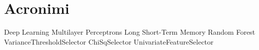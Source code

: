 \documentclass[main.tex]{subfiles}
\begin{document}
\chapter*{Acronimi}
\label{chap:Acronyms}
\begin{acronym}

     {Deep Learning}
     {Multilayer Perceptrons}
     {Long Short-Term Memory}
     {Random Forest}
     {VarianceThresholdSelector}
     {ChiSqSelector}
     {UnivariateFeatureSelector}
    


\end{acronym} 
\end{document}
